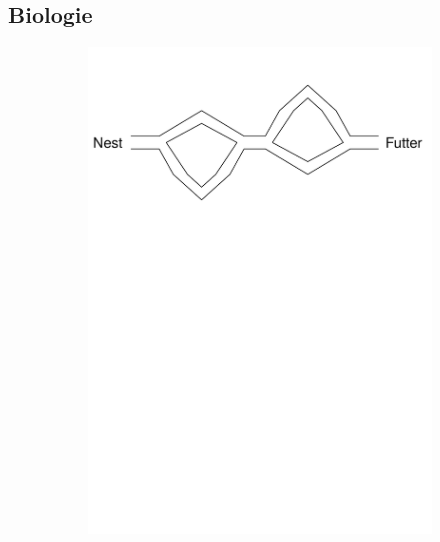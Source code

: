 \documentclass[pdftex,
               12pt,
               DIV=12,
               a4paper,
               twoside,
               parskip=half,
               abstract=true,
               dvipsnames]{scrartcl}
\begin{document}
\subsection{Biologie}
\begin{figure}[h]
	\centering
	\begin{subfigure}{0.45\textwidth}
		\includegraphics[width=\linewidth, page=2]{aco_biology}
		\caption{} \label{subfig:ACO_biologie_a}
	\end{subfigure}
	\begin{subfigure}{0.45\textwidth}

\end{subfigure}
\end{figure}
\end{document}
